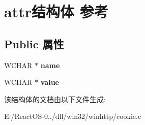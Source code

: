 \hypertarget{structattr}{}\section{attr结构体 参考}
\label{structattr}
\subsection*{Public 属性}
\begin{DoxyCompactItemize}
\item 
\mbox{\label{structattr_aab22204407141016866a7318a2eb8c38}} 
W\+C\+H\+AR $\ast$ {\bfseries name}
\item 
\mbox{\label{structattr_a5bbf495f0001337449522a078dfc3caa}} 
W\+C\+H\+AR $\ast$ {\bfseries value}
\end{DoxyCompactItemize}


该结构体的文档由以下文件生成\+:\begin{DoxyCompactItemize}
\item 
E\+:/\+React\+O\+S-\/0../dll/win32/winhttp/cookie.\+c\end{DoxyCompactItemize}
